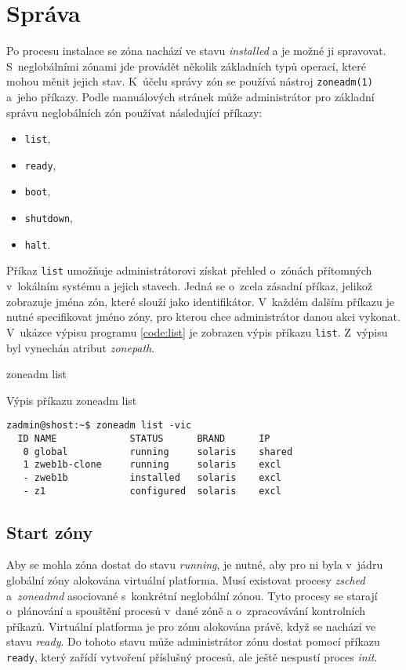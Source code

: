 \section{Správa}
\label{chapter:zones:management}
Po procesu instalace se zóna nachází ve stavu \textit{installed} a je možné ji spravovat. S~neglobálními zónami jde provádět
několik základních typů operací, které mohou měnit jejich stav. K~účelu správy zón se používá nástroj \verb|zoneadm(1)|
a~jeho příkazy. Podle manuálových stránek \cite{oracle:manpages:zoneadm} může administrátor pro základní správu neglobálních
zón používat následující příkazy:
\begin{itemize}
 \item \verb|list|,
 \item \verb|ready|,
 \item \verb|boot|,
 \item \verb|shutdown|,
 \item \verb|halt|.
\end{itemize}
Příkaz \verb|list| umožňuje administrátorovi získat přehled o~zónách přítomných v~lokálním systému a jejich stavech. Jedná
se o~zcela zásadní příkaz, jelikož zobrazuje jména zón, které slouží jako identifikátor. V~každém dalším příkazu je nutné 
specifikovat jméno zóny, pro kterou chce administrátor danou akci vykonat. V~ukázce výpisu programu \ref{code:list} je zobrazen
výpis příkazu \verb|list|. Z~výpisu byl vynechán atribut \textit{zonepath}.
\begin{verbbox}zoneadm list\end{verbbox}
\begin{listing}[ht]
  \caption{Výpis příkazu zoneadm list}
  \label{code:list}
  \begin{verbatim}
zadmin@shost:~$ zoneadm list -vic
  ID NAME             STATUS      BRAND      IP    
   0 global           running     solaris    shared
   1 zweb1b-clone     running     solaris    excl     
   - zweb1b           installed   solaris    excl  
   - z1               configured  solaris    excl     
  \end{verbatim}
\end{listing}
\subsection{Start zóny}
\label{chapter:zones:management:start}
Aby se mohla zóna dostat do stavu \textit{running}, je nutné, aby pro ni byla v~jádru globální zóny alokována virtuální platforma.
Musí existovat procesy \textit{zsched} a~\textit{zoneadmd} asociované s~konkrétní neglobální zónou. Tyto procesy
se starají o~plánování a spouštění procesů v~dané zóně a o~zpracovávání kontrolních příkazů. Virtuální platforma je pro zónu
alokována právě, když se nachází ve stavu \textit{ready}. Do tohoto stavu může administrátor zónu dostat pomocí příkazu 
\verb|ready|, který zařídí vytvoření příslušný procesů, ale ještě nespustí proces \textit{init}.

